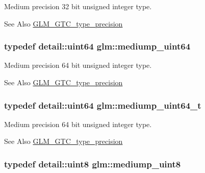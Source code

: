 Medium precision 32 bit unsigned integer type. \begin{DoxySeeAlso}{See Also}
\hyperlink{group__gtc__type__precision}{G\-L\-M\-\_\-\-G\-T\-C\-\_\-type\-\_\-precision} 
\end{DoxySeeAlso}
\hypertarget{group__gtc__type__precision_ga6685788d15d0a973ee7c2460d0456dc1}{
\subsubsection[{mediump\-\_\-uint64}]{\setlength{\rightskip}{0pt plus 5cm}typedef detail\-::uint64 {\bf glm\-::mediump\-\_\-uint64}}}\label{group__gtc__type__precision_ga6685788d15d0a973ee7c2460d0456dc1}
Medium precision 64 bit unsigned integer type. \begin{DoxySeeAlso}{See Also}
\hyperlink{group__gtc__type__precision}{G\-L\-M\-\_\-\-G\-T\-C\-\_\-type\-\_\-precision} 
\end{DoxySeeAlso}
\hypertarget{group__gtc__type__precision_gaa97354d3120a6dc029a5e9563723de18}{
\subsubsection[{mediump\-\_\-uint64\-\_\-t}]{\setlength{\rightskip}{0pt plus 5cm}typedef detail\-::uint64 {\bf glm\-::mediump\-\_\-uint64\-\_\-t}}}\label{group__gtc__type__precision_gaa97354d3120a6dc029a5e9563723de18}
Medium precision 64 bit unsigned integer type. \begin{DoxySeeAlso}{See Also}
\hyperlink{group__gtc__type__precision}{G\-L\-M\-\_\-\-G\-T\-C\-\_\-type\-\_\-precision} 
\end{DoxySeeAlso}
\hypertarget{group__gtc__type__precision_gac4b849eaac0543a10f97f4bdda4850a8}{
\subsubsection[{mediump\-\_\-uint8}]{\setlength{\rightskip}{0pt plus 5cm}typedef detail\-::uint8 {\bf glm\-::mediump\-\_\-uint8}}}\label{group__gtc__type__precision_gac4b849eaac0543a10f97f4bdda4850a8}
